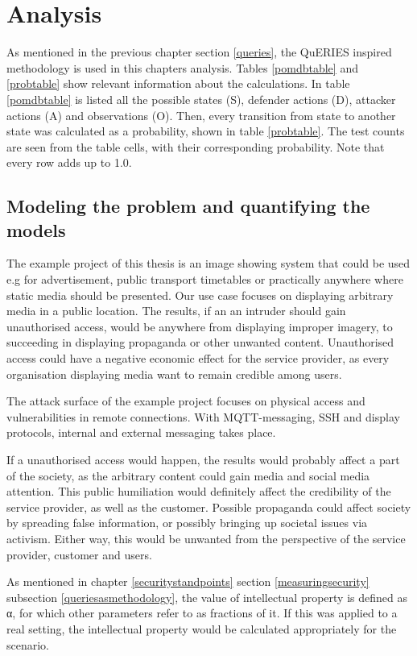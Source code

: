 
\chapter{Analysis} \label{analysis}

As mentioned in the previous chapter section \ref{queries}, the
QuERIES inspired methodology is used in this chapters analysis. Tables
\ref{pomdbtable} and \ref{probtable} show relevant information about
the calculations. In table \ref{pomdbtable} is listed all the possible
states (S), defender actions (D), attacker actions (A) and
observations (O). Then, every transition from state to another state
was calculated as a probability, shown in table \ref{probtable}. The
test counts are seen from the table cells, with their corresponding
probability. Note that every row adds up to 1.0.

\section{Modeling the problem and quantifying the models} \label{modprob}

The example project of this thesis is an image showing system that
could be used e.g for advertisement, public transport timetables or
practically anywhere where static media should be presented. Our use
case focuses on displaying arbitrary media in a public location. The
results, if an an intruder should gain unauthorised access, would be
anywhere from displaying improper imagery, to succeeding in displaying
propaganda or other unwanted content. Unauthorised access could have a
negative economic effect for the service provider, as every
organisation displaying media want to remain credible among users.

The attack surface of the example project focuses on physical access
and vulnerabilities in remote connections. With MQTT-messaging, SSH
and display protocols, internal and external messaging takes place.

If a unauthorised access would happen, the results would probably
affect a part of the society, as the arbitrary content could gain
media and social media attention. This public humiliation would
definitely affect the credibility of the service provider, as well as
the customer. Possible propaganda could affect society by spreading
false information, or possibly bringing up societal issues via
activism. Either way, this would be unwanted from the perspective of
the service provider, customer and users.

As mentioned in chapter \ref{securitystandpoints} section
\ref{measuringsecurity} subsection \ref{queriesasmethodology}, the
value of intellectual property is defined as α, for which other
parameters refer to as fractions of it. If this was applied to a real
setting, the intellectual property would be calculated appropriately
for the scenario.

